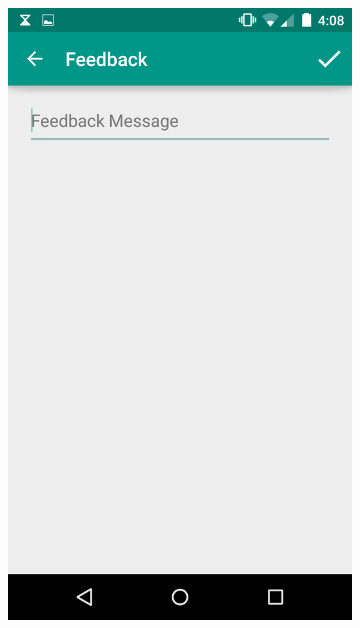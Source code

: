 \documentclass[11pt,english,numbers=endperiod,parskip=half]{scrartcl}
\begin{document}
\begin{figure}[H]
\begin{subfigure}{.5\textwidth}
      \includegraphics[width=.7\linewidth]{images/ss6.png}
    \end{subfigure}
  \end{figure}
\end{document}
